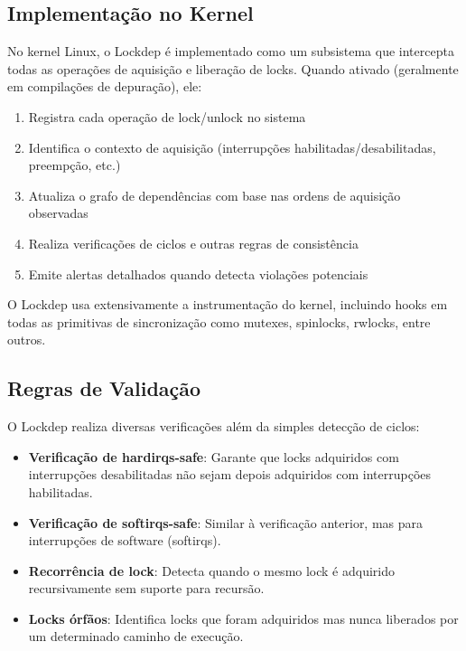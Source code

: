 \subsection{Implementação no Kernel}

No kernel Linux, o Lockdep é implementado como um subsistema que intercepta todas as operações de aquisição e liberação de locks. Quando ativado (geralmente em compilações de depuração), ele:

\begin{enumerate}
    \item Registra cada operação de lock/unlock no sistema
    \item Identifica o contexto de aquisição (interrupções habilitadas/desabilitadas, preempção, etc.)
    \item Atualiza o grafo de dependências com base nas ordens de aquisição observadas
    \item Realiza verificações de ciclos e outras regras de consistência
    \item Emite alertas detalhados quando detecta violações potenciais
\end{enumerate}

O Lockdep usa extensivamente a instrumentação do kernel, incluindo hooks em todas as primitivas de sincronização como mutexes, spinlocks, rwlocks, entre outros.

\subsection{Regras de Validação}

O Lockdep realiza diversas verificações além da simples detecção de ciclos:

\begin{itemize}
    \item \textbf{Verificação de hardirqs-safe}: Garante que locks adquiridos com interrupções desabilitadas não sejam depois adquiridos com interrupções habilitadas.

    \item \textbf{Verificação de softirqs-safe}: Similar à verificação anterior, mas para interrupções de software (softirqs).

    \item \textbf{Recorrência de lock}: Detecta quando o mesmo lock é adquirido recursivamente sem suporte para recursão.

    \item \textbf{Locks órfãos}: Identifica locks que foram adquiridos mas nunca liberados por um determinado caminho de execução.
\end{itemize}

